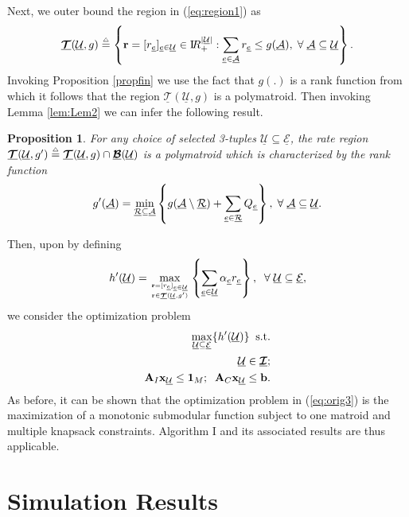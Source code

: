 \documentclass[11pt] {article}
\newcommand{\Reals}     {{{\mathrm I\!R}}}  \newcommand{\Cplx}      {{{\mathsf I}\!\!\!{\mathrm C}}} \newcommand{\NCplx}     {{{\mathcal{CN}}}} \newcommand{\Ints}      {{{\mathbb Z}}} \newcommand{\Rats}      {{{\mathsf I}\!\!\!{\mathrm Q}}}    \newcommand{\Nats}      {{{\mathrm{ I\!N}}}} \newcommand{\Tee}{      {{\mathbb T}}}
\newcommand{\uwti}[1]{{\mathbf #1}}
\newcommand{\bb}{{\uwti b}}  \newcommand{\Bb}{{\uwti B}}
\newcommand{\rb}{{\uwti r}}  \newcommand{\Rb}{{\uwti R}}
\newcommand{\xb}{{\uwti x}}  \newcommand{\Xb}{{\uwti X}}
\newcommand{\Bulk} {{\underline{{\bm {\mathcal B}}}}}
\newcommand{\Tulk} {{\underline{{\bm {\mathcal T}}}}}
\newcommand{\Iulk} {{\underline{{\bm {\mathcal I}}}}}
\newcommand{\Aulc} {{\underline{\mathcal A}}}
\newcommand{\Uulc} {{\underline{\mathcal U}}}
\newcommand{\Eulc} {{\underline{\mathcal E}}}
\newcommand{\Rulc} {{\underline{\mathcal R}}}
\newtheorem{proposition}{Proposition}
\begin{document}
    Next, we   outer bound the region in (\ref{eq:region1}) as
    \begin{eqnarray}\label{eq:region2}
 \Tulk(\Uulc,g)\define \left\{\rb=[r_{\eul}]_{\eul\in\Uulc}\in\Reals_+^{|\Uulc|}:\sum_{\eul\in\Aulc}r_{\eul}\leq g(\Aulc),\;\forall\;\Aulc\subseteq\Uulc\right\}.
 \end{eqnarray}
  Invoking Proposition \ref{propfin} we use the fact that $g(.)$ is a rank function from which it follows that the region $\Tulk(\Uulc,g)$ is a polymatroid. Then invoking Lemma \ref{lem:Lem2} we can infer the following result.
   \begin{proposition}\label{propfin2}
  For any choice of selected 3-tuples $\Uulc\subseteq\Eulc$, the  rate region
   $\Tulk(\Uulc,g')\define \Tulk(\Uulc,g)\cap \Bulk(\Uulc)$ is a polymatroid
 which is characterized by the rank function
  \begin{eqnarray}\label{eq:gpdef}
 g'(\Aulc)=   \min_{\Rulc\subseteq \Aulc}\left\{g(\Aulc\setminus\Rulc) +\sum_{\eul\in\Rulc}Q_{\eul}\right\}, \;\forall\;\Aulc\subseteq \Uulc.
 \end{eqnarray}
  \end{proposition}









Then, upon by defining
\begin{eqnarray*}
  h'(\Uulc) = \max_{\rb=[r_{\eul}]_{\eul\in\Uulc}\atop\rb\in \Tulk(\Uulc,g') }  \left\{\sum_{\eul\in\Uulc}\alpha_{\eul}r_{\eul}\right\},\;\;\forall\;\Uulc\subseteq\Eulc,
 \end{eqnarray*}
 we consider the optimization problem
 \begin{eqnarray}\label{eq:orig3}
 \nonumber \max_{\Uulc\subseteq\Eulc} \{h'(\Uulc)\}\;\; {\rm s.t.}\\
 \nonumber\Uulc\in\Iulk;\\
  \Ab_I\xb_{\Uulc}\leq {\bf 1}_M;\;\;\Ab_C\xb_{\Uulc}\leq \bb.
 \end{eqnarray}
  As before, it can be shown that the optimization problem in (\ref{eq:orig3}) is the maximization of a monotonic submodular   function subject to one matroid and multiple knapsack constraints. Algorithm I and its associated results are thus applicable.





\section{Simulation Results}
\end{document}
